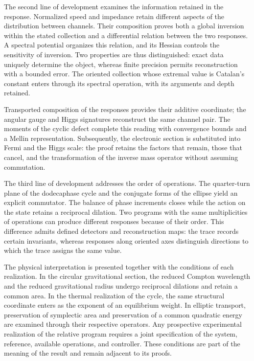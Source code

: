 The second line of development examines the information retained in the
response. Normalized speed and impedance retain different aspects of the
distribution between channels. Their composition proves both a global
inversion within the stated collection and a differential relation between
the two responses. A spectral potential organizes this relation, and its
Hessian controls the sensitivity of inversion. Two properties are thus
distinguished: exact data uniquely determine the object, whereas finite
precision permits reconstruction with a bounded error. The oriented
collection whose extremal value is Catalan's constant enters through its
spectral operation, with its arguments and depth retained.

Transported composition of the responses provides their additive
coordinate; the angular gauge and Higgs signatures reconstruct the same
channel pair. The moments of the cyclic defect complete this reading
with convergence bounds and a Mellin representation. Subsequently, the
electronic section is substituted into Fermi and the Higgs scale: the
proof retains the factors that remain, those that cancel, and the
transformation of the inverse mass operator without assuming commutation.

The third line of development addresses the order of operations. The
quarter-turn plane of the dodecaphase cycle and the conjugate forms of the
ellipse yield an explicit commutator. The balance of phase increments
closes while the action on the state retains a reciprocal dilation. Two
programs with the same multiplicities of operations can produce different
responses because of their order. This difference admits defined
detectors and reconstruction maps: the trace records certain invariants,
whereas responses along oriented axes distinguish directions to which the
trace assigns the same value.

The physical interpretation is presented together with the conditions of
each realization. In the circular gravitational section, the reduced
Compton wavelength and the reduced gravitational radius undergo
reciprocal dilations and retain a common area. In the thermal realization
of the cycle, the same structural coordinate enters as the exponent of an
equilibrium weight. In elliptic transport, preservation of symplectic area
and preservation of a common quadratic energy are examined through their
respective operators. Any prospective experimental realization of the relative
program requires a joint specification of the system, reference,
available operations, and controller. These conditions are part of the
meaning of the result and remain adjacent to its proofs.

